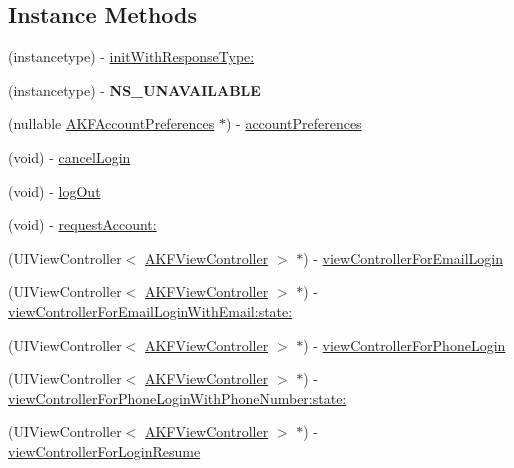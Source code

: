 \subsection*{Instance Methods}
\begin{DoxyCompactItemize}
\item 
(instancetype) -\/ \hyperlink{interface_a_k_f_account_kit_a9c2fc06e9b26c94d19b54c6e9adc0010}{init\+With\+Response\+Type\+:}
\item 
\hypertarget{interface_a_k_f_account_kit_a96eaa77d34e9b00e3b0c75a5179a76f5}{}(instancetype) -\/ {\bfseries N\+S\+\_\+\+U\+N\+A\+V\+A\+I\+L\+A\+B\+L\+E}\label{interface_a_k_f_account_kit_a96eaa77d34e9b00e3b0c75a5179a76f5}

\item 
(nullable \hyperlink{interface_a_k_f_account_preferences}{A\+K\+F\+Account\+Preferences} $\ast$) -\/ \hyperlink{interface_a_k_f_account_kit_a04f85f6087f4f3d503935fecf081606e}{account\+Preferences}
\item 
(void) -\/ \hyperlink{interface_a_k_f_account_kit_a4befd5b5da3c3a4e4b868dc1e2a20ee9}{cancel\+Login}
\item 
(void) -\/ \hyperlink{interface_a_k_f_account_kit_a34755906f0c698eeb0db0a6d2e22b06c}{log\+Out}
\item 
(void) -\/ \hyperlink{interface_a_k_f_account_kit_ac1bf48cfc7d77fe4720aa134fe127625}{request\+Account\+:}
\item 
(U\+I\+View\+Controller$<$ \hyperlink{protocol_a_k_f_view_controller-p}{A\+K\+F\+View\+Controller} $>$ $\ast$) -\/ \hyperlink{interface_a_k_f_account_kit_a19a30692950c7eda0abd6d7460b9bc59}{view\+Controller\+For\+Email\+Login}
\item 
(U\+I\+View\+Controller$<$ \hyperlink{protocol_a_k_f_view_controller-p}{A\+K\+F\+View\+Controller} $>$ $\ast$) -\/ \hyperlink{interface_a_k_f_account_kit_a096234954145c1df8b01cd3ed2fc44f4}{view\+Controller\+For\+Email\+Login\+With\+Email\+:state\+:}
\item 
(U\+I\+View\+Controller$<$ \hyperlink{protocol_a_k_f_view_controller-p}{A\+K\+F\+View\+Controller} $>$ $\ast$) -\/ \hyperlink{interface_a_k_f_account_kit_ac830816cb15455aa2d0c8a6807dedb0a}{view\+Controller\+For\+Phone\+Login}
\item 
(U\+I\+View\+Controller$<$ \hyperlink{protocol_a_k_f_view_controller-p}{A\+K\+F\+View\+Controller} $>$ $\ast$) -\/ \hyperlink{interface_a_k_f_account_kit_a0c021ffc193a8b338b017a765c5f9117}{view\+Controller\+For\+Phone\+Login\+With\+Phone\+Number\+:state\+:}
\item 
(U\+I\+View\+Controller$<$ \hyperlink{protocol_a_k_f_view_controller-p}{A\+K\+F\+View\+Controller} $>$ $\ast$) -\/ \hyperlink{interface_a_k_f_account_kit_a3eb6a2554a6196ca459c812e32210b3d}{view\+Controller\+For\+Login\+Resume}
\end{DoxyCompactItemize}
